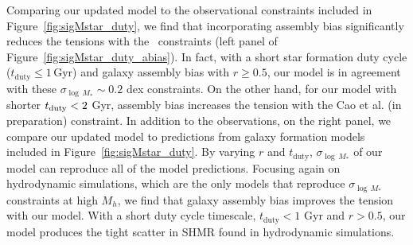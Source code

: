 \documentclass[12pt, letterpaper, preprint, tighten]{aastex62}
\begin{document}
Comparing our updated model to the observational constraints included in 
Figure~\ref{fig:sigMstar_duty}, we find that incorporating assembly bias 
significantly reduces the tensions with the~\cite{more2011, leauthaud2012, reddick2013, tinker2013, zu2015} 
constraints (left panel of Figure~\ref{fig:sigMstar_duty_abias}). In fact, 
with a short star formation duty cycle ($t_\mathrm{duty} \leq 1\,\mathrm{Gyr}$) 
and galaxy assembly bias with $r \ge 0.5$, our model is in agreement with 
these $\sigma_{\log\,M_*} \sim 0.2$ dex constraints. On the other hand, 
for our model with shorter $t_{\rm duty} < 2$ Gyr, assembly bias increases 
the tension with the Cao et al. (in preparation) constraint. 
In addition to the observations, on the right panel, we compare our updated 
model to predictions from galaxy formation models included in Figure~\ref{fig:sigMstar_duty}.
By varying $r$ and $t_\mathrm{duty}$, $\sigma_{\log\,M_*}$ of our model 
can reproduce all of the model predictions. Focusing again on hydrodynamic
simulations, which are the only models that reproduce $\sigma_{\log\,M_*}$ 
constraints at high $M_h$, we find that galaxy assembly bias 
improves the tension with our model. With a short duty cycle timescale, 
$t_\mathrm{duty} < 1$ Gyr and $r > 0.5$, our model produces the tight
scatter in SHMR found in hydrodynamic simulations. 
\end{document}
